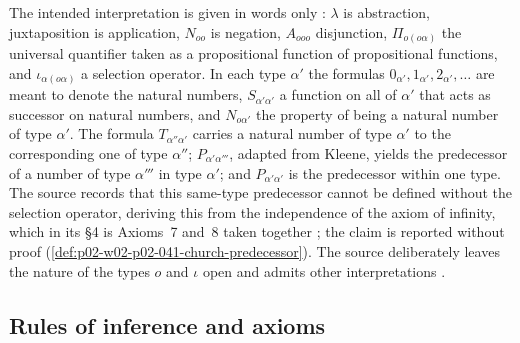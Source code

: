 The intended interpretation is given in words only
\cite[\S2, p.~59]{Church1940}: \(\lambda\) is abstraction, juxtaposition is
application, \(N_{oo}\) is negation, \(A_{ooo}\) disjunction,
\(\Pi_{o(o\alpha)}\) the universal quantifier taken as a propositional
function of propositional functions, and \(\iota_{\alpha(o\alpha)}\) a
selection operator.  In each type \(\alpha'\) the formulas
\(0_{\alpha'},1_{\alpha'},2_{\alpha'},\ldots\) are meant to denote the
natural numbers, \(S_{\alpha'\alpha'}\) a function on all of \(\alpha'\)
that acts as successor on natural numbers, and \(N_{o\alpha'}\) the property
of being a natural number of type \(\alpha'\).  The formula
\(T_{\alpha''\alpha'}\) carries a natural number of type \(\alpha'\) to the
corresponding one of type \(\alpha''\); \(P_{\alpha'\alpha'''}\), adapted from
Kleene, yields the predecessor of a number of type \(\alpha'''\) in type
\(\alpha'\); and \(P_{\alpha'\alpha'}\) is the predecessor within one type.
The source records that this same-type predecessor cannot be defined
without the selection operator, deriving this from the independence of the
axiom of infinity, which in its \S4 is Axioms~7 and~8 taken together
\cite[\S2, p.~59; \S4, p.~61]{Church1940}; the claim is reported without
proof (\cref{def:p02-w02-p02-041-church-predecessor}).  The source deliberately leaves the nature of
the types \(o\) and \(\iota\) open and admits other interpretations
\cite[\S1, p.~57]{Church1940}.

\subsection{Rules of inference and axioms}

